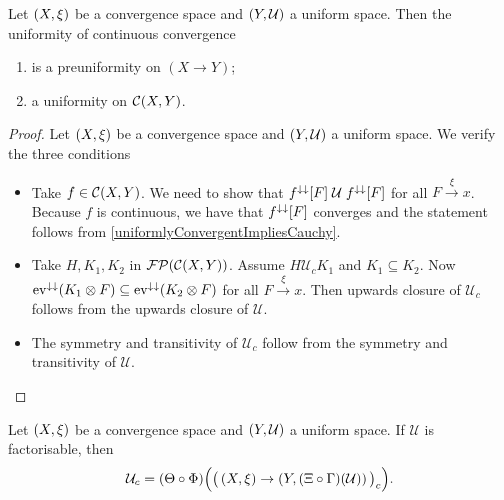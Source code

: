 \begin{lemma}
Let $\left( X, \xi \right)$ be a convergence space and $\left( Y, \mathcal{U} \right)$ a uniform space. Then the uniformity of continuous convergence
\begin{enumerate}
\item is a preuniformity on $(X\to Y)$;
\item a uniformity on $\operatorname{\mathcal{C}}(X,Y)$.
\end{enumerate}
\end{lemma}
\begin{proof}
Let $\left( X,\xi \right)$ be a convergence space and $\left( Y,\mathcal{U} \right)$ a uniform space. We verify the three conditions
\begin{itemize}
\item Take $f\in \operatorname{\mathcal{C}}(X,Y)$. We need to show that $f^{\downarrow\downarrow}[F]\mathrel{\mathcal{U}}f^{\downarrow\downarrow}[F]$ for all $F\overset{\xi}{\longrightarrow}x$. Because $f$ is continuous, we have that $f^{\downarrow\downarrow}[F]$ converges and the statement follows from \ref{uniformlyConvergentImpliesCauchy}.
\item Take $H,K_1,K_2$ in $\operatorname{\mathcal{FP}}(\operatorname{\mathcal{C}}(X,Y))$. Assume $H\mathrel{\mathcal{U}_c}K_1$ and $K_1\subseteq K_2$. Now $\operatorname{ev}^{\downarrow\downarrow}(K_1\otimes F) \subseteq \operatorname{ev}^{\downarrow\downarrow}(K_2\otimes F)$ for all $F\overset{\xi}{\longrightarrow}x$. Then upwards closure of $\mathcal{U}_c$ follows from the upwards closure of $\mathcal{U}$.
\item The symmetry and transitivity of $\mathcal{U}_c$ follow from the symmetry and transitivity of $\mathcal{U}$.
\end{itemize}
\end{proof}

\begin{lemma}
Let $\left( X, \xi \right)$ be a convergence space and $\left( Y, \mathcal{U} \right)$ a uniform space. If $\mathcal{U}$ is factorisable, then
\[ \mathcal{U}_c = (\Theta\circ\Phi)\Big(\big(\left( X,\xi \right) \to \left( Y, (\Xi\circ\Gamma)(\mathcal{U}) \right)\big)_c\Big). \]
\end{lemma}


